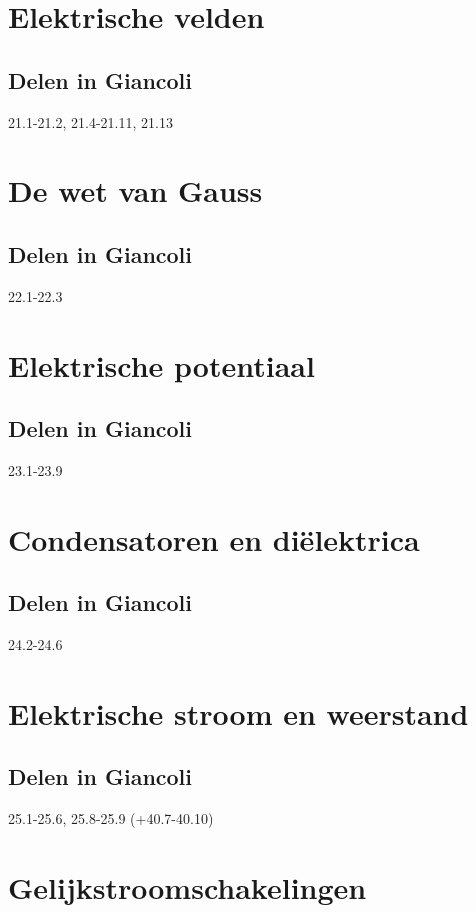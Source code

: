 \documentclass[12pt,a4paper]{article}
\begin{document}
    \section{Elektrische velden}

    \subsection{Delen in Giancoli}
    21.1-21.2, 21.4-21.11, 21.13


    \section{De wet van Gauss}

    \subsection{Delen in Giancoli}
    22.1-22.3


	\section{Elektrische potentiaal}

    \subsection{Delen in Giancoli}
    23.1-23.9


    \section{Condensatoren en diëlektrica}

    \subsection{Delen in Giancoli}
    24.2-24.6


    \section{Elektrische stroom en weerstand}

    \subsection{Delen in Giancoli}
    25.1-25.6, 25.8-25.9 (+40.7-40.10)


    \section{Gelijkstroomschakelingen}
\end{document}
